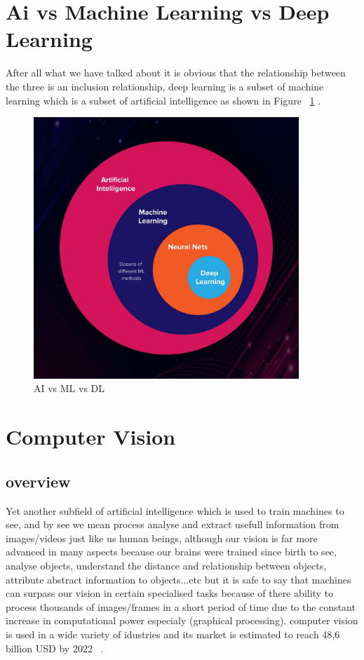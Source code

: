 \section{Ai vs Machine Learning vs Deep Learning}
    After all what we have talked about it is obvious that the relationship between the three is an inclusion relationship, deep learning is a subset of machine learning which is a subset of artificial intelligence as shown in Figure ~\ref{fig:versus} .

\begin{figure}[htbp]
\begin{center}
\includegraphics[width=10cm]{./chapter-02-general-ai-information/versus.jpg}
\end{center}
\caption{AI vs ML vs DL ~\cite{versus}}
\label{fig:versus}
\end{figure}





\section{Computer Vision}
    \subsection{overview}
        Yet another subfield of artificial intelligence which is used to train machines to see, and by see we mean process analyse and extract usefull information from images/videos just like us human beings, although our vision is far more advanced in many aspects because our brains were trained since birth to see, analyse objects, understand the distance and relationship between objects, attribute abstract information to objects...etc but it is safe to say that machines can surpass our vision in certain specialised tasks because of there ability to process thousands of images/frames in a short period of time due to the constant increase in computational power especialy (graphical processing). computer vision is used in a wide variety of idustries and its market is estimated to reach 48,6 billion USD by 2022 ~\cite{machine-learning-ibm}.


